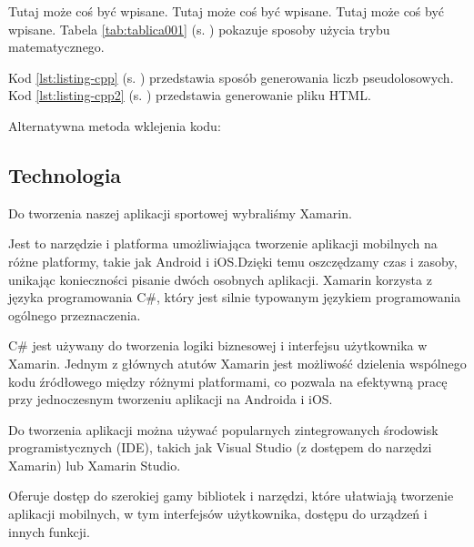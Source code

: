 Tutaj może coś być wpisane. Tutaj może coś być wpisane. Tutaj może coś być wpisane. Tabela \ref{tab:tablica001} (s. \pageref{tab:tablica001}) pokazuje sposoby użycia trybu matematycznego.

Kod \ref{lst:listing-cpp} (s. \pageref{lst:listing-cpp}) przedstawia sposób generowania liczb pseudolosowych. Kod \ref{lst:listing-cpp2} (s. \pageref{lst:listing-cpp2}) przedstawia generowanie pliku HTML.

Alternatywna metoda wklejenia kodu:



\newpage
\subsection{Technologia}  %

Do tworzenia naszej aplikacji sportowej wybraliśmy Xamarin.

Jest to narzędzie i platforma umożliwiająca tworzenie aplikacji mobilnych na różne platformy, takie jak Android i iOS.Dzięki temu oszczędzamy czas i zasoby, unikając konieczności pisanie dwóch osobnych aplikacji. Xamarin korzysta z języka programowania C\#, który jest silnie typowanym językiem programowania ogólnego przeznaczenia.

C\# jest używany do tworzenia logiki biznesowej i interfejsu użytkownika w Xamarin.
Jednym z głównych atutów Xamarin jest możliwość dzielenia wspólnego kodu źródłowego między różnymi platformami, co pozwala na efektywną pracę przy jednoczesnym tworzeniu aplikacji na Androida i iOS.

Do tworzenia aplikacji można używać popularnych zintegrowanych środowisk programistycznych (IDE), takich jak Visual Studio (z dostępem do narzędzi Xamarin) lub Xamarin Studio.

Oferuje dostęp do szerokiej gamy bibliotek i narzędzi, które ułatwiają tworzenie aplikacji mobilnych, w tym interfejsów użytkownika, dostępu do urządzeń i innych funkcji.
 
 
 
 